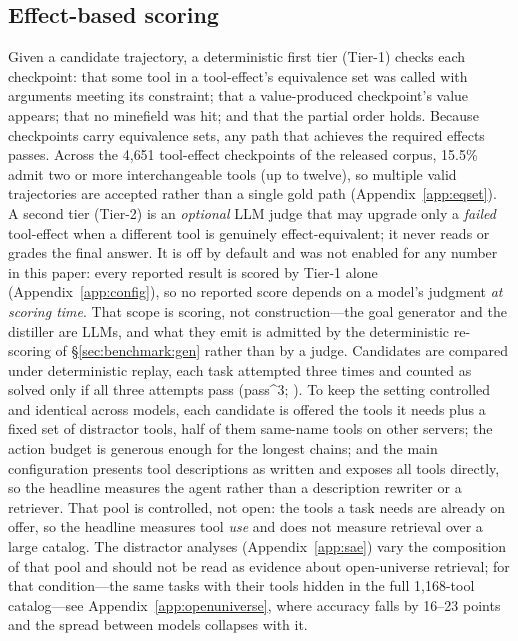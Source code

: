 \subsection{Effect-based scoring}
\label{sec:benchmark:eval}
Given a candidate trajectory, a deterministic first tier (Tier-1) checks each
checkpoint: that some tool in a tool-effect's equivalence set was called with
arguments meeting its constraint; that a value-produced checkpoint's value
appears; that no minefield was hit; and that the partial order holds. Because
checkpoints carry equivalence sets, any path that achieves the required
effects passes. Across the 4{,}651 tool-effect checkpoints of the released
corpus, 15.5\% admit two or more interchangeable tools (up to twelve), so
multiple valid trajectories are accepted rather than a single gold path
(Appendix~\ref{app:eqset}). A
second tier (Tier-2) is an \emph{optional} LLM judge that may upgrade only a
\emph{failed} tool-effect when a different tool is genuinely
effect-equivalent; it never reads or grades the final answer. It is off by
default and was not enabled for any number in this paper: every reported
result is scored by Tier-1 alone (Appendix~\ref{app:config}), so no reported
score depends on a model's judgment \emph{at scoring time}. That scope is
scoring, not construction---the goal generator and the distiller are LLMs, and
what they emit is admitted by the deterministic re-scoring of
\S\ref{sec:benchmark:gen} rather than by a judge.
Candidates are compared under deterministic replay, each task attempted three
times and counted as solved only if all three attempts pass
(pass\textasciicircum{}3; \citealp{yao2024tau}). To keep the setting controlled
and identical across models, each candidate is offered the tools it needs
plus a fixed set of distractor tools, half of them same-name tools on other
servers; the action budget is generous enough for the longest chains; and the
main configuration presents tool descriptions as written and exposes all
tools directly, so the headline measures the agent rather than a description
rewriter or a retriever. That pool is controlled, not open: the tools a task
needs are already on offer, so the headline measures tool \emph{use} and does
not measure retrieval over a large catalog. The distractor analyses
(Appendix~\ref{app:sae}) vary the composition of that pool and should not be
read as evidence about open-universe retrieval; for that condition---the same
tasks with their tools hidden in the full 1{,}168-tool catalog---see
Appendix~\ref{app:openuniverse}, where accuracy falls by 16--23 points and the
spread between models collapses with it.

